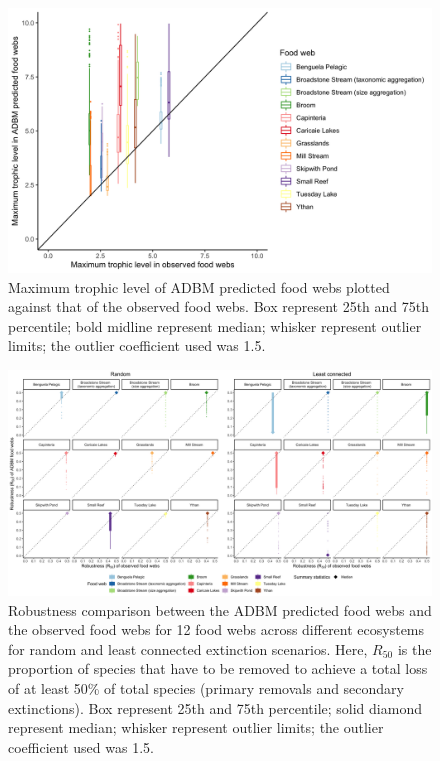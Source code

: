 \documentclass{article}
\begin{document}
\begin{figure}

{\centering \includegraphics[width=450px]{../results/plot_max_tl_ADBM_vs_emp} 

}

\caption{\label{fig:fig_a1} Maximum trophic level of ADBM predicted food webs plotted against that of the observed food webs. Box represent 25th and 75th percentile; bold midline represent median; whisker represent outlier limits; the outlier coefficient used was 1.5.}\label{fig:unnamed-chunk-7}
\end{figure}

\begin{figure}

{\centering \includegraphics[width=450px]{../results/plot_R50_ADBM_vs_obs_ra_lc_facet} 

}

\caption{\label{fig:fig_a2} Robustness comparison between the ADBM predicted food webs and the observed food webs for 12 food webs across different ecosystems for random and least connected extinction scenarios. Here, $R_{50}$ is the proportion of species that have to be removed to achieve a total loss of at least 50\% of total species (primary removals and secondary extinctions). Box represent 25th and 75th percentile; solid diamond represent median; whisker represent outlier limits; the outlier coefficient used was 1.5.}\label{fig:unnamed-chunk-8}
\end{figure}
\end{document}
